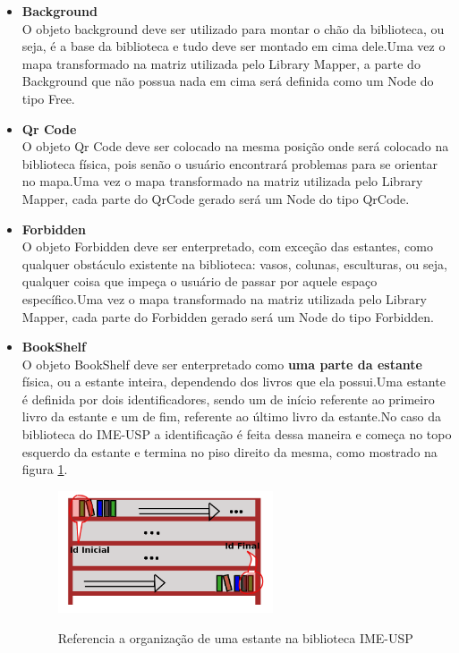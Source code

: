 \documentclass[a4paper,10pt]{article}
\begin{document}
\begin{itemize}	
	\item{{\bf Background  }}\\
		O objeto background deve ser utilizado para montar o chão da biblioteca, ou seja, é a base da biblioteca e tudo deve ser montado em cima dele.Uma vez o mapa transformado na matriz utilizada pelo Library Mapper, a parte do Background que não possua nada em cima será definida como um Node do tipo Free. 	
	\item{{\bf Qr Code  }}\\	
		O objeto Qr Code deve ser colocado na mesma posição onde será colocado na biblioteca física, pois senão o usuário encontrará problemas para se orientar no mapa.Uma vez o mapa transformado na matriz utilizada pelo Library Mapper, cada parte do QrCode gerado será um Node do tipo QrCode. 	
	\item{{\bf Forbidden  }}\\
		O objeto Forbidden deve ser enterpretado, com exceção das estantes, como qualquer obstáculo existente na biblioteca: vasos, colunas, esculturas, ou seja, qualquer coisa que impeça o usuário de passar por aquele espaço específico.Uma vez o mapa transformado na matriz utilizada pelo Library Mapper, cada parte do Forbidden gerado será um Node do tipo Forbidden.	
	\item{{\bf BookShelf }}\\
		O objeto BookShelf deve ser enterpretado como {\bf uma parte da estante} física, ou a estante inteira, dependendo dos livros que ela possui.Uma estante é definida por dois identificadores, sendo um de início referente ao primeiro livro da estante e um de fim, referente ao último livro da estante.No caso da biblioteca do IME-USP a identificação é feita dessa maneira e começa no topo esquerdo da estante e termina no piso direito da mesma, como mostrado na figura \ref{estante}.
\begin{figure}[H]
	\centering
	\includegraphics[width=0.60\textwidth]{./imgs/estanteIME.png}\\[1cm]   
	\caption{Referencia a organização de uma estante na biblioteca IME-USP}
	\label{estante}
\end{figure}


\end{itemize}
\end{document}
